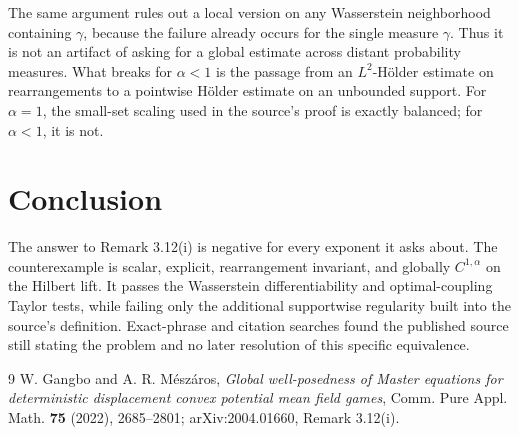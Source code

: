 \documentclass[11pt]{article}
\begin{document}
The same argument rules out a local version on any Wasserstein
neighborhood containing \(\gamma\), because the failure already occurs
for the single measure \(\gamma\). Thus it is not an artifact of asking
for a global estimate across distant probability measures. What breaks
for \(\alpha<1\) is the passage from an \(L^2\)-H\"older estimate on
rearrangements to a pointwise H\"older estimate on an unbounded support.
For \(\alpha=1\), the small-set scaling used in the source's proof is
exactly balanced; for \(\alpha<1\), it is not.

\section{Conclusion}

The answer to Remark 3.12(i) is negative for every exponent it asks
about. The counterexample is scalar, explicit, rearrangement invariant,
and globally \(C^{1,\alpha}\) on the Hilbert lift. It passes the
Wasserstein differentiability and optimal-coupling Taylor tests, while
failing only the additional supportwise regularity built into the
source's definition. Exact-phrase and citation searches found the
published source still stating the problem and no later resolution of
this specific equivalence.

\begin{thebibliography}{9}
W. Gangbo and A. R. M\'esz\'aros,
\emph{Global well-posedness of Master equations for deterministic
displacement convex potential mean field games},
Comm. Pure Appl. Math. \textbf{75} (2022), 2685--2801;
arXiv:2004.01660, Remark 3.12(i).
\end{thebibliography}
\end{document}

